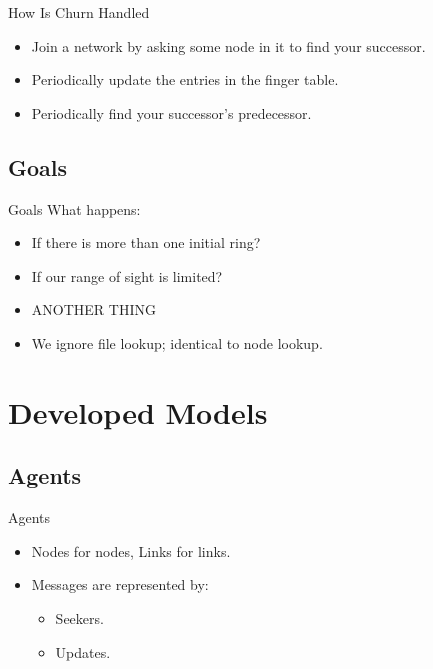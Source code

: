 \documentclass{beamer}
\begin{document}
\begin{frame}{How Is Churn Handled}
	\begin{itemize}
		\item Join a network by asking some node in it to find your successor.
		\item Periodically update the entries in the finger table.
		\item Periodically find your successor's predecessor.
	\end{itemize}

\end{frame}

\subsection{Goals}

\begin{frame}{Goals}
What happens:
	\begin{itemize}
		\item If there is more than one initial ring?
		\item If our range of sight is limited?
		\item ANOTHER THING
		\item We ignore file lookup; identical to node lookup.
	\end{itemize}

\end{frame}



\section{Developed Models} 


\subsection{Agents}
\begin{frame}{Agents}
	\begin{itemize}
		\item Nodes for nodes, Links for links.
		\item Messages are represented by:
		\begin{itemize}
			\item Seekers.
			\item Updates.
		\end{itemize}
	\end{itemize}
\end{frame}
\end{document}
